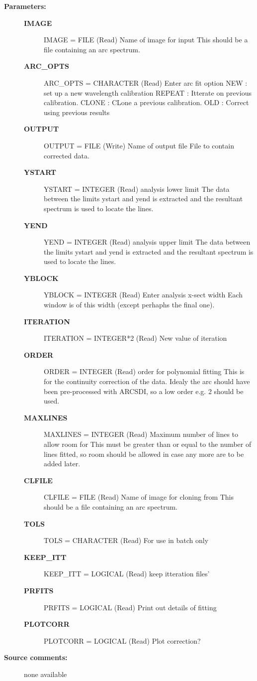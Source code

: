 \begin{description}
\item [\textbf{Parameters:}]
\begin{description}
\item [\textbf{IMAGE}]
    IMAGE = FILE (Read)
        Name of image for input
          This should be a file containing an arc spectrum.
\item [\textbf{ARC\_OPTS}]
    ARC\_OPTS = CHARACTER (Read)
        Enter arc fit option
          NEW    : set up a new wavelength calibration
          REPEAT : Itterate on previous calibration.
          CLONE  : CLone a previous calibration.
          OLD    : Correct using previous results
\item [\textbf{OUTPUT}]
    OUTPUT = FILE (Write)
        Name of output file
           File to contain corrected data.
\item [\textbf{YSTART}]
    YSTART = INTEGER (Read)
        analysis lower limit
            The data between the limits ystart and yend is extracted
            and the resultant spectrum is used to locate the lines.
\item [\textbf{YEND}]
    YEND = INTEGER (Read)
        analysis upper limit
            The data between the limits ystart and yend is extracted
            and the resultant spectrum is used to locate the lines.
\item [\textbf{YBLOCK}]
    YBLOCK = INTEGER (Read)
        Enter analysis x-sect width
            Each window is of this width (except perhaphs the final one).
\item [\textbf{ITERATION}]
    ITERATION = INTEGER*2 (Read)
        New value of iteration
\item [\textbf{ORDER}]
    ORDER = INTEGER (Read)
        order for polynomial fitting
          This is for the continuity correction of the data. Idealy the
          arc should have been pre-processed with ARCSDI, so a low
          order e.g. 2 should be used.
\item [\textbf{MAXLINES}]
    MAXLINES = INTEGER (Read)
        Maximum number of lines to allow room for
          This must be greater than or equal to the number of lines
          fitted, so room should be allowed in case any more are
          to be added later.
\item [\textbf{CLFILE}]
    CLFILE = FILE (Read)
        Name of image for cloning from
          This should be a file containing an arc spectrum.
\item [\textbf{TOLS}]
    TOLS = CHARACTER (Read)
        For use in batch only
\item [\textbf{KEEP\_ITT}]
    KEEP\_ITT = LOGICAL (Read)
        keep itteration files'
\item [\textbf{PRFITS}]
    PRFITS = LOGICAL (Read)
        Print out details of fitting
\item [\textbf{PLOTCORR}]
    PLOTCORR = LOGICAL (Read)
        Plot correction?
\end{description}

\item [\textbf{Source comments:}]
\begin{terminalv}
  none available

\end{terminalv}
\end{description}

